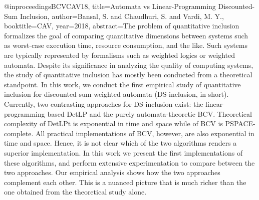 @inproceedings{BCVCAV18,
title={Automata vs Linear-Programming Discounted-Sum Inclusion},
author={Bansal, S. and  Chaudhuri, S. and  Vardi, M. Y.},
booktitle=CAV,
year={2018},
abstract={The problem of quantitative inclusion formalizes the goal of comparing quantitative dimensions between systems such as worst-case execution time, resource consumption, and the like. Such systems are typically represented by formalisms such as weighted logics or weighted automata. Despite its significance in analyzing the quality of computing systems, the study of quantitative inclusion has mostly been conducted from a theoretical standpoint. In this work, we conduct the first empirical study of quantitative inclusion for discounted-sum weighted automata (DS-inclusion, in short). 
    Currently, two contrasting approaches for DS-inclusion exist: the linear-programming based DetLP  and the purely automata-theoretic BCV.
Theoretical complexity of DetLPt is exponential in time and space while of BCV is PSPACE-complete. All practical implementations of BCV, however, are also exponential in time and space. Hence, it is not clear which of the two algorithms renders a superior implementation.
    In this work we present the first implementations of  these algorithms, and perform  extensive experimentation to compare between the two approaches. Our empirical analysis shows how the two approaches complement each other. This is a nuanced picture that is much richer than the one obtained from the theoretical study alone. }
}
